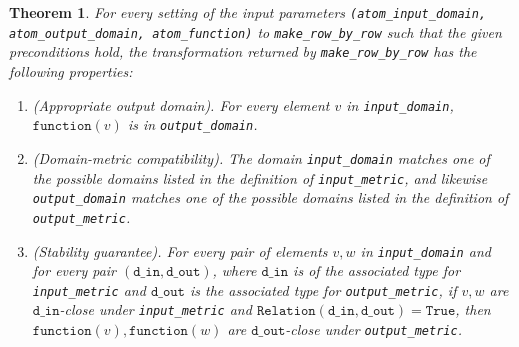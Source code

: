 \documentclass[11pt,a4paper]{article}
\newtheorem{theorem}{Theorem}[section]
\newcommand{\din}{\texttt{d\_in}}
\newcommand{\dout}{\texttt{d\_out}}
\newcommand{\Relation}{\texttt{Relation}}
\newcommand{\True}{\texttt{True}}
\newcommand{\function}{\texttt{function}}
\begin{document}
\begin{theorem}
    For every setting of the input parameters \texttt{(atom\_input\_domain, atom\_output\_domain, atom\_function)} to \texttt{make\_row\_by\_row} such that the given preconditions
    hold, the transformation returned by \texttt{make\_row\_by\_row} has the following properties:
    \begin{enumerate}
        \item \textup{(Appropriate output domain).} For every element $v$ in \texttt{input\_domain}, $\function(v)$ is in \texttt{output\_domain}. 
        
        \item \textup{(Domain-metric compatibility).} The domain \texttt{input\_domain} matches one of the possible domains listed in the definition of \texttt{input\_metric}, and likewise \texttt{output\_domain} matches one of the possible domains listed in the definition of \texttt{output\_metric}.
        
        \item \textup{(Stability guarantee).} For every pair of elements $v, w$ in \texttt{input\_domain} and for every pair $(\din, \dout)$, where $\din$ is of the associated type for \texttt{input\_metric} and $\dout$ is the associated type for \texttt{output\_metric}, if $v,w$ are $\din$-close under \texttt{input\_metric} and $\Relation(\din, \dout) = \True$, then $\function(v), \function(w)$ are $\dout$-close under \texttt{output\_metric}.
    \end{enumerate}
\end{theorem}
\end{document}
